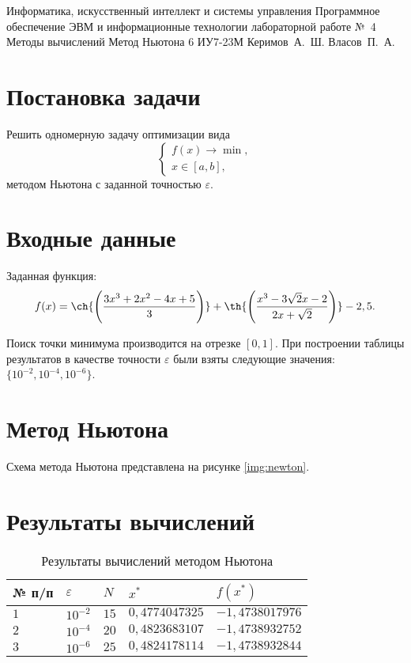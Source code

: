 \documentclass{bmstu-gost-7-32}
\begin{document}
\makereporttitle
	{Информатика, искусственный интеллект и системы управления} %
	{Программное обеспечение ЭВМ и информационные технологии} %
	{лабораторной работе №~4} %
	{Методы вычислений} %
	{Метод Ньютона} %
	{6} %
	{ИУ7-23М} %
	{Керимов~А.~Ш.} %
	{Власов~П.~А.} %

\section*{Постановка задачи}

Решить одномерную задачу оптимизации вида
\begin{equation}
	\begin{cases}
		f(x) \to \min, \\
		x \in [a, b],
	\end{cases}
\end{equation}
методом Ньютона с заданной точностью $\varepsilon$.

\section*{Входные данные}

Заданная функция:
\begin{equation}
	f(x) = \ch{\left(\frac{3x^3 + 2x^2 - 4x + 5}{3}\right)} + \th{\left(\frac{x^3 - 3\sqrt2x - 2}{2x + \sqrt2}\right)} - 2,5.
\end{equation}

Поиск точки минимума производится на отрезке $[0, 1]$.
При построении таблицы результатов в качестве точности $\varepsilon$ были взяты следующие значения: $\{10^{-2}, 10^{-4}, 10^{-6}\}$.

\section*{Метод Ньютона}

Схема метода Ньютона представлена на рисунке \ref{img:newton}.


\section*{Результаты вычислений}

\begin{table}[H]
	\caption{Результаты вычислений методом Ньютона}
	\begin{tabular}{|l|l|l|l|l|}
		\hline
		№ п/п & $\varepsilon$ & $N$  & $x^*$          & $f(x^*)$   \\ \hline
		$1$   & $10^{-2}$     & $15$ & $0,4774047325$ & $-1,4738017976$ \\ \hline
		$2$   & $10^{-4}$     & $20$ & $0,4823683107$ & $-1,4738932752$ \\ \hline
		$3$   & $10^{-6}$     & $25$ & $0,4824178114$ & $-1,4738932844$ \\ \hline
	\end{tabular}
\end{table}
\end{document}
